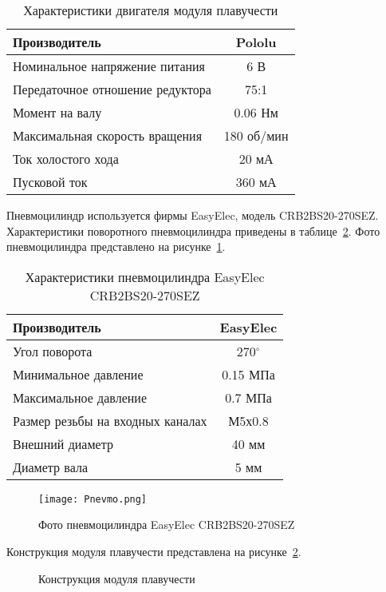 \begin{table}[h]
	\centering
	\caption{Характеристики двигателя модуля плавучести}\label{tabMicroMotor}
	\begin{tabular}{|l|c|}
		\hline
		Производитель &	Pololu \\ \hline
		Номинальное напряжение питания & 6 В \\ \hline
		Передаточное отношение редуктора & 75:1 \\ \hline
		Момент на валу & 0.06 Нм\\ \hline
		Максимальная скорость вращения & 180 об/мин \\ \hline
		Ток холостого хода & 20 мА\\ \hline
		Пусковой ток & 360 мА \\ \hline
	\end{tabular}
\end{table}

Пневмоцилиндр используется фирмы EasyElec, модель CRB2BS20-270SEZ. Характеристики поворотного пневмоцилиндра приведены в таблице~\ref{tabPnevmo}. Фото пневмоцилиндра представлено на рисунке~\ref{Pnevmo}.

\begin{table}[h]
	\centering
	\caption{Характеристики пневмоцилиндра EasyElec CRB2BS20-270SEZ}\label{tabPnevmo}
	\begin{tabular}{|l|c|}
		\hline
		Производитель &	EasyElec \\ \hline
		Угол поворота & 270$^{\circ}$ \\ \hline
		Минимальное давление & 0.15 МПа \\ \hline
		Максимальное давление & 0.7 МПа \\ \hline
		Размер резьбы на входных каналах & М5х0.8 \\ \hline
		Внешний диаметр & 40 мм\\ \hline
		Диаметр вала & 5 мм \\ \hline
	\end{tabular}
\end{table}

\begin{figure}[h]
	\centering
	\texttt{[image: Pnevmo.png]}%
	\caption{Фото пневмоцилиндра EasyElec CRB2BS20-270SEZ}
	\label{Pnevmo}
\end{figure}

Конструкция модуля плавучести представлена на рисунке~\ref{FloatModule}.

\begin{figure}[!ht]
	\begin{minipage}[h]{0.5\linewidth}
	\end{minipage}
	\hfill
	\begin{minipage}[h]{0.5\linewidth}
	\end{minipage}
	\caption{Конструкция модуля плавучести}
	\label{FloatModule}
\end{figure}

